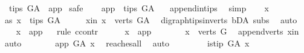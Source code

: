 \begin{isabellebody}
\ \ {\isachardoublequoteopen}tips\ G{\isacharunderscore}{\kern0pt}A\ {\isacharequal}{\kern0pt}\ {\isacharbraceleft}{\kern0pt}app{\isacharbraceright}{\kern0pt}{\isachardoublequoteclose}\isanewline
%
\isadelimproof
%
\endisadelimproof
%
\isatagproof
{}\isamarkupfalse%
\ safe\isanewline
\ \ \isamarkupfalse%
\ {\isachardoublequoteopen}app\ {\isasymin}\ tips\ G{\isacharunderscore}{\kern0pt}A\ {\isachardoublequoteclose}\ \isamarkupfalse%
\ append{\isacharunderscore}{\kern0pt}in{\isacharunderscore}{\kern0pt}tips\ \isamarkupfalse%
\ simp\isanewline
\ \ \isamarkupfalse%
\ x\ \isanewline
\ \ \isamarkupfalse%
\ as{}{\isacharcolon}{\kern0pt}\ {\isachardoublequoteopen}x\ {\isasymin}\ tips\ G{\isacharunderscore}{\kern0pt}A{\isachardoublequoteclose}\isanewline
\ \ \isamarkupfalse%
\ \isamarkupfalse%
\ x{\isacharunderscore}{\kern0pt}in{\isacharcolon}{\kern0pt}\ {\isachardoublequoteopen}x\ {\isasymin}\ verts\ G{\isacharunderscore}{\kern0pt}A{\isachardoublequoteclose}\ \isamarkupfalse%
\ digraph{\isachardot}{\kern0pt}tips{\isacharunderscore}{\kern0pt}in{\isacharunderscore}{\kern0pt}verts\ bD{\isacharunderscore}{\kern0pt}A\ subs\ \isamarkupfalse%
\ auto\ \isanewline
\ \ \isamarkupfalse%
\ {\isachardoublequoteopen}x\ {\isacharequal}{\kern0pt}\ app{\isachardoublequoteclose}\isanewline
\ \ \isamarkupfalse%
{\isacharparenleft}{\kern0pt}rule\ ccontr{\isacharparenright}{\kern0pt}\isanewline
\ \ \ \ \isamarkupfalse%
\ {\isachardoublequoteopen}x\ {\isasymnoteq}\ app{\isachardoublequoteclose}\isanewline
\ \ \ \ \isamarkupfalse%
\ \isamarkupfalse%
\ {\isachardoublequoteopen}x\ {\isasymin}\ verts\ G{\isachardoublequoteclose}\ \isamarkupfalse%
\ append{\isacharunderscore}{\kern0pt}verts\ x{\isacharunderscore}{\kern0pt}in\ \isamarkupfalse%
\ auto\isanewline
\ \ \ \ \isamarkupfalse%
\ \isamarkupfalse%
\ {\isachardoublequoteopen}app\ {\isasymrightarrow}\isactrlsup {\isacharplus}{\kern0pt}\isactrlbsub G{\isacharunderscore}{\kern0pt}A\isactrlesub \ x{\isachardoublequoteclose}\ \isamarkupfalse%
\ reaches{\isacharunderscore}{\kern0pt}all\ \isamarkupfalse%
\ auto\isanewline
\ \ \ \ \isamarkupfalse%
\ \isamarkupfalse%
\ {\isachardoublequoteopen}{\isasymnot}\ is{\isacharunderscore}{\kern0pt}tip\ G{\isacharunderscore}{\kern0pt}A\ x{\isachardoublequoteclose}\ \ \isamarkupfalse%

\end{isabellebody}
